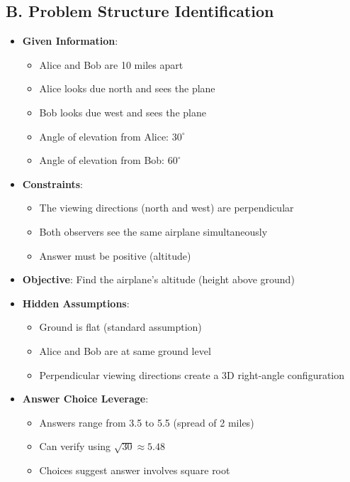 \documentclass[12pt]{article}
\begin{document}
\begin{problemconfigbox}
\subsection*{B. Problem Structure Identification}
\begin{itemize}[leftmargin=*]
    \item \textbf{Given Information}: 
    \begin{itemize}
        \item Alice and Bob are 10 miles apart
        \item Alice looks due north and sees the plane
        \item Bob looks due west and sees the plane
        \item Angle of elevation from Alice: $30^\circ$
        \item Angle of elevation from Bob: $60^\circ$
    \end{itemize}
    \item \textbf{Constraints}: 
    \begin{itemize}
        \item The viewing directions (north and west) are perpendicular
        \item Both observers see the same airplane simultaneously
        \item Answer must be positive (altitude)
    \end{itemize}
    \item \textbf{Objective}: Find the airplane's altitude (height above ground)
    \item \textbf{Hidden Assumptions}: 
    \begin{itemize}
        \item Ground is flat (standard assumption)
        \item Alice and Bob are at same ground level
        \item Perpendicular viewing directions create a 3D right-angle configuration
    \end{itemize}
    \item \textbf{Answer Choice Leverage}: 
    \begin{itemize}
        \item Answers range from 3.5 to 5.5 (spread of 2 miles)
        \item Can verify using $\sqrt{30} \approx 5.48$
        \item Choices suggest answer involves square root
    \end{itemize}
\end{itemize}


\end{problemconfigbox}
\end{document}
